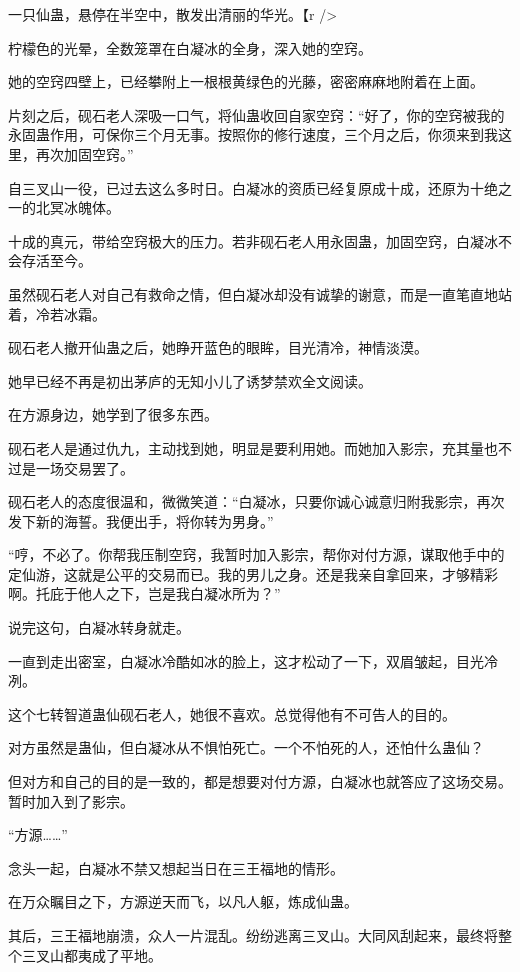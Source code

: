 
\begin{this_body}

一只仙蛊，悬停在半空中，散发出清丽的华光。【r />

柠檬色的光晕，全数笼罩在白凝冰的全身，深入她的空窍。

她的空窍四壁上，已经攀附上一根根黄绿色的光藤，密密麻麻地附着在上面。

片刻之后，砚石老人深吸一口气，将仙蛊收回自家空窍：“好了，你的空窍被我的永固蛊作用，可保你三个月无事。按照你的修行速度，三个月之后，你须来到我这里，再次加固空窍。”

自三叉山一役，已过去这么多时日。白凝冰的资质已经复原成十成，还原为十绝之一的北冥冰魄体。

十成的真元，带给空窍极大的压力。若非砚石老人用永固蛊，加固空窍，白凝冰不会存活至今。

虽然砚石老人对自己有救命之情，但白凝冰却没有诚挚的谢意，而是一直笔直地站着，冷若冰霜。

砚石老人撤开仙蛊之后，她睁开蓝色的眼眸，目光清冷，神情淡漠。

她早已经不再是初出茅庐的无知小儿了诱梦禁欢全文阅读。

在方源身边，她学到了很多东西。

砚石老人是通过仇九，主动找到她，明显是要利用她。而她加入影宗，充其量也不过是一场交易罢了。

砚石老人的态度很温和，微微笑道：“白凝冰，只要你诚心诚意归附我影宗，再次发下新的海誓。我便出手，将你转为男身。”

“哼，不必了。你帮我压制空窍，我暂时加入影宗，帮你对付方源，谋取他手中的定仙游，这就是公平的交易而已。我的男儿之身。还是我亲自拿回来，才够精彩啊。托庇于他人之下，岂是我白凝冰所为？”

说完这句，白凝冰转身就走。

一直到走出密室，白凝冰冷酷如冰的脸上，这才松动了一下，双眉皱起，目光冷冽。

这个七转智道蛊仙砚石老人，她很不喜欢。总觉得他有不可告人的目的。

对方虽然是蛊仙，但白凝冰从不惧怕死亡。一个不怕死的人，还怕什么蛊仙？

但对方和自己的目的是一致的，都是想要对付方源，白凝冰也就答应了这场交易。暂时加入到了影宗。

“方源……”

念头一起，白凝冰不禁又想起当日在三王福地的情形。

在万众瞩目之下，方源逆天而飞，以凡人躯，炼成仙蛊。

其后，三王福地崩溃，众人一片混乱。纷纷逃离三叉山。大同风刮起来，最终将整个三叉山都夷成了平地。


\end{this_body}
